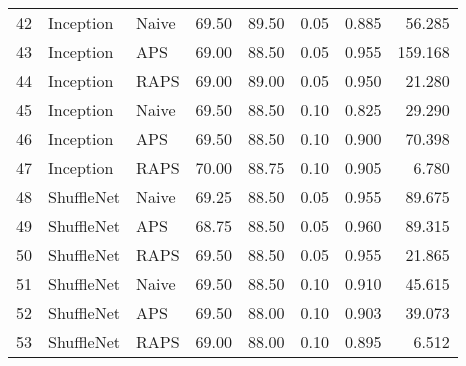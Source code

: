 \begin{tabular}{lllrrrrr}
42 &    Inception &     Naive &  69.50 &  89.50 &   0.05 &     0.885 &   56.285 \\
43 &    Inception &       APS &  69.00 &  88.50 &   0.05 &     0.955 &  159.168 \\
44 &    Inception &      RAPS &  69.00 &  89.00 &   0.05 &     0.950 &   21.280 \\
45 &    Inception &     Naive &  69.50 &  88.50 &   0.10 &     0.825 &   29.290 \\
46 &    Inception &       APS &  69.50 &  88.50 &   0.10 &     0.900 &   70.398 \\
47 &    Inception &      RAPS &  70.00 &  88.75 &   0.10 &     0.905 &    6.780 \\
48 &   ShuffleNet &     Naive &  69.25 &  88.50 &   0.05 &     0.955 &   89.675 \\
49 &   ShuffleNet &       APS &  68.75 &  88.50 &   0.05 &     0.960 &   89.315 \\
50 &   ShuffleNet &      RAPS &  69.50 &  88.50 &   0.05 &     0.955 &   21.865 \\
51 &   ShuffleNet &     Naive &  69.50 &  88.50 &   0.10 &     0.910 &   45.615 \\
52 &   ShuffleNet &       APS &  69.50 &  88.00 &   0.10 &     0.903 &   39.073 \\
53 &   ShuffleNet &      RAPS &  69.00 &  88.00 &   0.10 &     0.895 &    6.512 \\
\bottomrule
\end{tabular}
